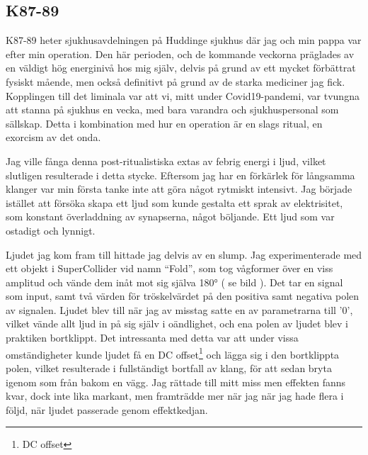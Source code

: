 \documentclass{article}
\begin{document}
  \subsection{K87-89}
  K87-89 heter sjukhusavdelningen på Huddinge sjukhus där jag och min pappa var efter min operation. Den här
  perioden, och de kommande veckorna präglades av en väldigt hög energinivå hos mig själv, delvis på grund av
  ett mycket förbättrat fysiskt mående, men också definitivt på grund av de starka mediciner jag fick.
  Kopplingen till det liminala var att vi, mitt under Covid19-pandemi, var tvungna att stanna på sjukhus en
  vecka, med bara varandra och sjukhuspersonal som sällskap. Detta i kombination med hur en operation är en
  slags ritual, en exorcism av det onda. 

  Jag ville fånga denna post-ritualistiska extas av febrig energi i ljud, vilket slutligen resulterade i detta
  stycke. Eftersom jag har en förkärlek för långsamma klanger var min första tanke inte att göra något
  rytmiskt intensivt. Jag började istället att försöka skapa ett ljud som kunde gestalta ett sprak av
  elektrisitet, som konstant överladdning av synapserna, något böljande. Ett ljud som var ostadigt och
  lynnigt. 

  Ljudet jag kom fram till hittade jag delvis av en slump. Jag experimenterade med ett objekt i
  SuperCollider vid namn ``Fold'', som tog vågformer över en viss amplitud och vände dem inåt mot sig själva
  180° ( se bild ). Det tar en signal som input, samt två värden för tröskelvärdet på den positiva samt
  negativa polen av signalen. Ljudet blev till när jag av misstag satte en av parametrarna till '0', vilket
  vände allt ljud in på sig själv i oändlighet, och ena polen av ljudet blev i praktiken bortklippt. Det
  intressanta med detta var att under vissa omständigheter kunde ljudet få en DC offset\footnote{DC offset}
  och lägga sig i den bortklippta polen, vilket resulterade i fullständigt bortfall av klang, för att sedan
  bryta igenom som från bakom en vägg. Jag rättade till mitt miss men effekten fanns kvar, dock inte lika
  markant, men framträdde mer när jag när jag hade flera i följd, när ljudet passerade genom effektkedjan.
\end{document}

